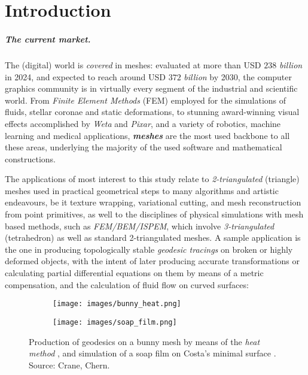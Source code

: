 \chapter{Introduction}

\paragraph{The current market.}
The (digital) world is \textit{covered} in meshes: evaluated at more than
USD $238$\textit{ billion} \cite{360iMarket2025ComputerGraphics} in
2024, and expected to reach around USD $372$ \textit{billion} by 2030,
the computer graphics community is in virtually every
segment of the industrial and scientific world. From 
\textit{Finite Element Methods} (FEM) employed for the
simulations of fluids,
stellar coronae and static deformations, to
stunning award-winning visual effects accomplished
by \textit{Weta} and \textit{Pixar}, and a variety of robotics,
machine learning and medical applications, \textit{\textbf{meshes}}
are the most used backbone to all these areas, underlying
the majority of the used software and mathematical
constructions.

\spa

The applications of most interest
to this study relate to \textit{2-triangulated} (triangle) meshes used in practical
geometrical steps to many algorithms and artistic endeavours, be it
texture wrapping, variational cutting, and mesh reconstruction
from point primitives, as well to the disciplines of physical simulations 
with mesh based methods, such as \textit{FEM/BEM/ISPEM}, which involve
\textit{3-triangulated} (tetrahedron) as well as standard 2-triangulated meshes.
A sample application is the one in producing
topologically stable \textit{geodesic tracings} on broken or highly deformed
objects, with the intent of later producing accurate transformations
or calculating partial differential equations on them by means of a metric
compensation, and the calculation of fluid flow on curved surfaces:

\begin{figure}[h]
    \centering
    \begin{subfigure}[t]{0.4\textwidth}
        \centering
        \texttt{[image: images/bunny\_heat.png]}
    \end{subfigure}
    \begin{subfigure}[t]{0.4\textwidth}
        \centering
        \texttt{[image: images/soap\_film.png]}
    \end{subfigure}
    
    \caption{Production of geodesics on a bunny mesh by means of the
    \textit{heat method} \cite{Crane:2017Heat}, and simulation of a soap
    film on Costa's minimal surface \cite{chern_cohomology}.
    Source: Crane, Chern.}
    \label{fig:two-images}
\end{figure}


